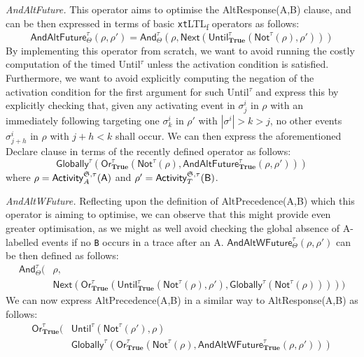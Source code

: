 \documentclass[sigconf]{acmart}
\begin{document}
\textit{AndAltFuture.} This operator aims  to optimise the \textsf{AltResponse(A,B)} clause, and can be then expressed in terms of basic \texttt{xt}LTL\textsubscript{f} operators as follows:
\begin{equation}\label{AAF}
\textsf{AndAltFuture}^\tau_\Theta(\rho,\rho')=\textsf{And}^\tau_\Theta(\rho,\textsf{Next}(\textsf{Until}^\tau_\textbf{True}(\textsf{Not}^\tau(\rho),\rho')))
\end{equation}
By implementing this operator from scratch, we want to avoid running the costly computation of the timed \textsf{Until}$^\tau$ unless the activation condition is satisfied. Furthermore, we want to avoid explicitly computing the negation of the activation condition for the first argument for such \textsf{Until}$^\tau$ and express this by explicitly checking that, given any activating event in $\sigma^i_j$ in $\rho$ with an immediately following targeting one $\sigma^i_{k}$ in $\rho'$ with $|\sigma^i|>k>j$, no other events $\sigma^i_{j+h}$ in $\rho$ with $j+h<k$ shall occur. We can then express the aforementioned Declare clause in terms of the recently defined operator as follows:
\[\textsf{Globally}^\tau(\textsf{Or}^\tau_\textbf{True}(\textsf{Not}^\tau(\rho),\textsf{AndAltFuture}^{\tau}_{\textbf{True}}(\rho,\rho')))\]
where $\rho=\textsf{Activity}^{\mathfrak{S},\tau}_A(\textsf{A})$ and $\rho'=\textsf{Activity}^{\mathfrak{S},\tau}_T(\textsf{B})$.
\medskip

\textit{AndAltWFuture.} Reflecting upon the definition of \textsf{AltPrecedence(A,B)} which this operator is aiming to optimise, we can observe that this might provide even greater optimisation, as we might as well avoid checking the global absence of \textsf{A}-labelled events if no \texttt{B} occurs in a trace after an \textsf{A}. $\textsf{AndAltWFuture}^\tau_\Theta(\rho,\rho')$ can be then defined as follows:
\begin{equation}\label{AAW}
\begin{split}
\textsf{And}^\tau_\Theta(&\rho,\\
&\textsf{Next}(\textsf{Or}^\tau_\textbf{True}(\textsf{Until}^\tau_\textbf{True}(\textsf{Not}^\tau(\rho),\rho'),\textsf{Globally}^\tau(\textsf{Not}^\tau(\rho)))))
\end{split}
\end{equation}
We can now express \textsf{AltPrecedence(A,B)} in a similar way to \textsf{AltResponse(A,B)} as follows:
\[\begin{split}
\textsf{Or}^\tau_{\textbf{True}}(&\textsf{Until}^\tau(\textsf{Not}^\tau(\rho'),\rho)\\
&\textsf{Globally}^\tau(\textsf{Or}^\tau_\textbf{True}(\textsf{Not}^\tau(\rho),\textsf{AndAltWFuture}^{\tau}_{\textbf{True}}(\rho,\rho')))\\
\end{split}\]
\medskip
\end{document}
